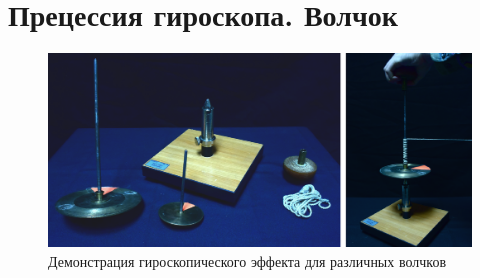%
%
%
%
%
%


	
	
		\section{Прецессия гироскопа. Волчок}
	
	\begin{figure}[H] 	
		\centering 	
		\includegraphics[width=0.9\linewidth]{gyro-4.png}
		\caption{Демонстрация гироскопического эффекта для различных волчков}
		\label{gyro-4}
	\end{figure}
	
